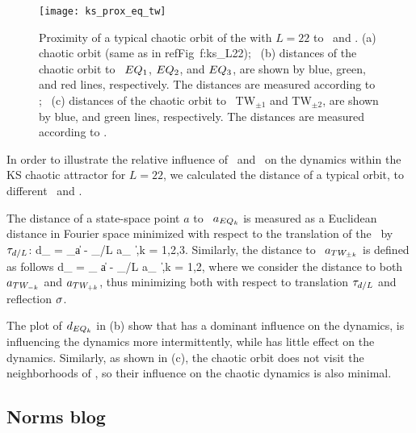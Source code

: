 \begin{figure}[t]
\begin{center}
\texttt{[image: ks\_prox\_eq\_tw]}
\end{center}
\caption{\color{blue}
Proximity of a typical chaotic orbit of the \KSe with $L =
22$ to \eqva\ and \reqva. (a) chaotic orbit (same as in
refFig~{f:ks\_L22}); ~(b) distances of the chaotic orbit to
\eqva\ $EQ_{1}$, $EQ_{2}$, and $EQ_{3}$, are shown by
blue, green, and red lines, respectively. The distances are
measured according to ; ~(c) distances of
the chaotic orbit to \reqva\ TW$_{\pm 1}$ and TW$_{\pm 2}$,
are shown by blue, and green lines, respectively. The
distances are measured according to .
     } \label{f:ks_prox_eq}
\end{figure}

In order to illustrate the relative influence of \eqva\ and \reqva\ on the dynamics
within the KS chaotic attractor for $L = 22$, we calculated the distance of a
typical orbit, to different \eqva\ and \reqva.

The distance of a state-space point $a$ to \eqv\ $a_{EQ_{k}}$ is measured as a
Euclidean distance in Fourier space minimized with respect to the translation
of the \eqv\ by $\tau_{d/L}$:
\beq
  d_{} = \min_\shift \|a - \Shift_{\shift/L} a_{} \|\,,\quad k = 1,2,3.
Similarly, the distance to \reqv\ $a_{TW_{\pm k}}$ is defined as follows
\beq
  d_{} = \min_{\shift} \|a - \Shift_{\shift/L} a_{} \|\,,\quad k = 1,2,
where we consider the distance to both $a_{TW_{-k}}$ and $a_{TW_{+k}}$, thus
minimizing both with respect to translation $\tau_{d/L}$ and reflection $\sigma$.

The plot of $d_{EQ_{k}}$ in (b) show that  has a dominant
influence on the dynamics,  is influencing the dynamics more intermittently, while
 has little effect on the dynamics.  Similarly, as shown in (c),
the chaotic orbit does not visit the neighborhoods of \reqva , so their influence on
the chaotic dynamics is also minimal.

\subsection{Norms blog}

